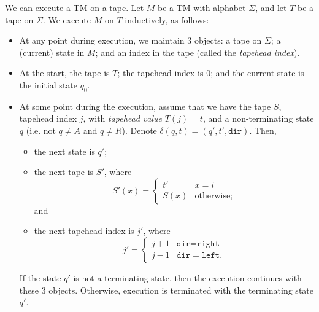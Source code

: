 We can execute a TM on a tape. Let $M$ be a TM with alphabet $\Sigma$, and let $T$ be a tape on $\Sigma$. We execute $M$ on $T$ inductively, as follows:
\begin{itemize}
    \item At any point during execution, we maintain 3 objects: a tape on $\Sigma$; a (current) state in $M$; and an index in the tape (called the \emph{tapehead index}).  

    \item At the start, the tape is $T$; the tapehead index is $0$; and the current state is the initial state $q_0$. 
    
    \item At some point during the execution, assume that we have the tape $S$, tapehead index $j$, with \emph{tapehead value} $T(j) = t$, and a non-terminating state $q$ (i.e. not $q \neq A$ and $q \neq R$). Denote $\delta(q, t) = (q', t', \texttt{dir})$. Then, 
    \begin{itemize}
        \item the next state is $q'$;
        \item the next tape is $S'$, where
        \[S'(x) = \begin{cases}
            t' & x = i \\
            S(x) & \text{otherwise};
        \end{cases}\]
        and
        \item the next tapehead index is $j'$, where
        \[j' = \begin{cases}
            j+1 & \texttt{dir} = \texttt{right} \\
            j-1 & \texttt{dir} = \texttt{left}.
        \end{cases}\]
    \end{itemize}
    If the state $q'$ is not a terminating state, then the execution continues with these 3 objects. Otherwise, execution is terminated with the terminating state $q'$.
\end{itemize}


